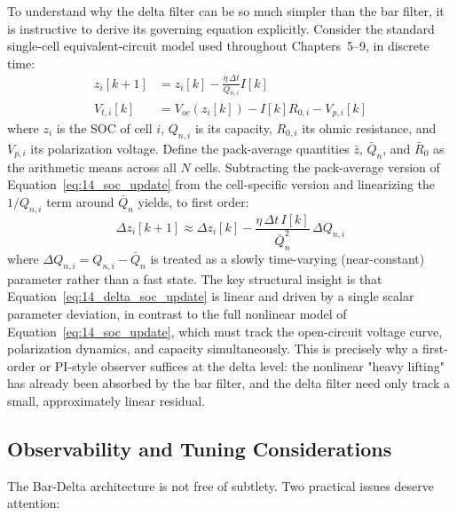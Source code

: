 To understand why the delta filter can be so much simpler than the bar filter, it is instructive to derive its governing equation explicitly. Consider the standard single-cell equivalent-circuit model used throughout Chapters~5–9, in discrete time:
\begin{align}
    z_i[k+1] &= z_i[k] - \frac{\eta \, \Delta t}{Q_{n,i}} I[k] \label{eq:14_soc_update}\\
    V_{t,i}[k] &= V_{oc}(z_i[k]) - I[k] R_{0,i} - V_{p,i}[k]
    \label{eq:14_voltage_model}
\end{align}
where $z_i$ is the SOC of cell $i$, $Q_{n,i}$ is its capacity, $R_{0,i}$ its ohmic resistance, and $V_{p,i}$ its polarization voltage. Define the pack-average quantities $\bar{z}$, $\bar{Q}_n$, and $\bar{R}_0$ as the arithmetic means across all $N$ cells. Subtracting the pack-average version of Equation~\ref{eq:14_soc_update} from the cell-specific version and linearizing the $1/Q_{n,i}$ term around $\bar{Q}_n$ yields, to first order:
\begin{equation}
    \Delta z_i[k+1] \approx \Delta z_i[k] - \frac{\eta \, \Delta t \, I[k]}{\bar{Q}_n^2}\, \Delta Q_{n,i}
    \label{eq:14_delta_soc_update}
\end{equation}
where $\Delta Q_{n,i} = Q_{n,i} - \bar{Q}_n$ is treated as a slowly time-varying (near-constant) parameter rather than a fast state. The key structural insight is that Equation~\ref{eq:14_delta_soc_update} is linear and driven by a single scalar parameter deviation, in contrast to the full nonlinear model of Equation~\ref{eq:14_soc_update}, which must track the open-circuit voltage curve, polarization dynamics, and capacity simultaneously. This is precisely why a first-order or PI-style observer suffices at the delta level: the nonlinear "heavy lifting" has already been absorbed by the bar filter, and the delta filter need only track a small, approximately linear residual.

\subsection{Observability and Tuning Considerations}
\label{subsec:14_observability}

The Bar-Delta architecture is not free of subtlety. Two practical issues deserve attention:

